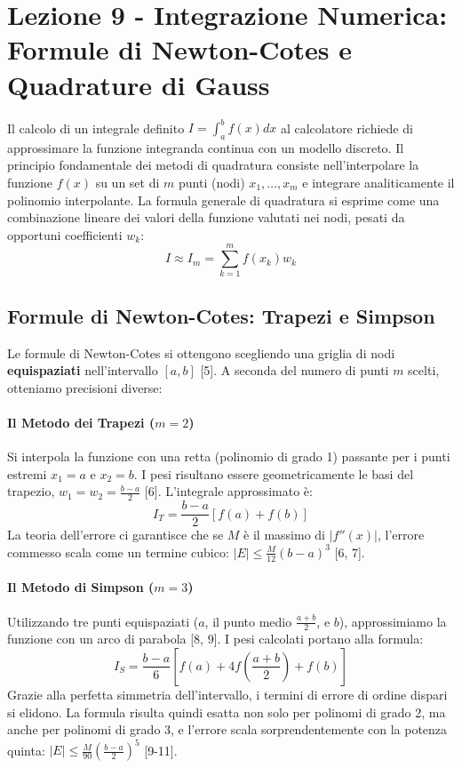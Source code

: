 \documentclass[12pt,a4paper]{article}
\begin{document}
\newpage
\section{Lezione 9 - Integrazione Numerica: Formule di Newton-Cotes e Quadrature di Gauss}
Il calcolo di un integrale definito $I = \int_a^b f(x) dx$ al calcolatore richiede di approssimare la funzione integranda continua con un modello discreto. Il principio fondamentale dei metodi di quadratura consiste nell'interpolare la funzione $f(x)$ su un set di $m$ punti (nodi) $x_1, \dots, x_m$ e integrare analiticamente il polinomio interpolante. 
La formula generale di quadratura si esprime come una combinazione lineare dei valori della funzione valutati nei nodi, pesati da opportuni coefficienti $w_k$:
\begin{equation}
I \approx I_m = \sum_{k=1}^m f(x_k) w_k
\end{equation}

\subsection{Formule di Newton-Cotes: Trapezi e Simpson}
Le formule di Newton-Cotes si ottengono scegliendo una griglia di nodi \textbf{equispaziati} nell'intervallo $[a, b]$ [5]. A seconda del numero di punti $m$ scelti, otteniamo precisioni diverse:

\paragraph{Il Metodo dei Trapezi ($m=2$)}
Si interpola la funzione con una retta (polinomio di grado 1) passante per i punti estremi $x_1=a$ e $x_2=b$. I pesi risultano essere geometricamente le basi del trapezio, $w_1 = w_2 = \frac{b-a}{2}$ [6]. L'integrale approssimato è:
\begin{equation}
I_T = \frac{b-a}{2} \left[ f(a) + f(b) \right]
\end{equation}
La teoria dell'errore ci garantisce che se $M$ è il massimo di $|f''(x)|$, l'errore commesso scala come un termine cubico: $|E| \le \frac{M}{12}(b-a)^3$ [6, 7].

\paragraph{Il Metodo di Simpson ($m=3$)}
Utilizzando tre punti equispaziati ($a$, il punto medio $\frac{a+b}{2}$, e $b$), approssimiamo la funzione con un arco di parabola [8, 9]. I pesi calcolati portano alla formula:
\begin{equation}
I_S = \frac{b-a}{6} \left[ f(a) + 4f\left(\frac{a+b}{2}\right) + f(b) \right]
\end{equation}
Grazie alla perfetta simmetria dell'intervallo, i termini di errore di ordine dispari si elidono. La formula risulta quindi esatta non solo per polinomi di grado 2, ma anche per polinomi di grado 3, e l'errore scala sorprendentemente con la potenza quinta: $|E| \le \frac{M}{90}\left(\frac{b-a}{2}\right)^5$ [9-11].
\end{document}

